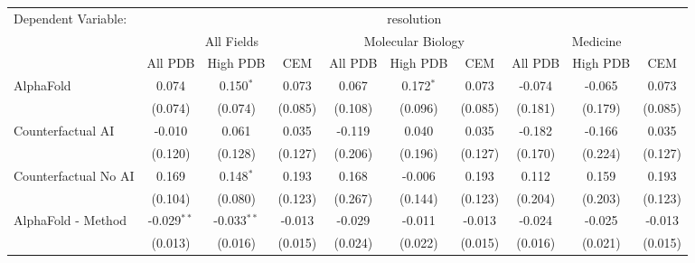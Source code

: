 \begingroup
\centering
\begin{tabular}{lccccccccc}
   \tabularnewline \midrule \midrule
   Dependent Variable: & \multicolumn{9}{c}{resolution}\\
 & \multicolumn{3}{c}{All Fields} & \multicolumn{3}{c}{Molecular Biology} & \multicolumn{3}{c}{Medicine} \\
\cmidrule(lr){2-7} \cmidrule(lr){5-10} \cmidrule(lr){8-7}
 & \multicolumn{1}{c}{All PDB} & \multicolumn{1}{c}{High PDB} & \multicolumn{1}{c}{CEM} & \multicolumn{1}{c}{All PDB} & \multicolumn{1}{c}{High PDB} & \multicolumn{1}{c}{CEM} & \multicolumn{1}{c}{All PDB} & \multicolumn{1}{c}{High PDB} & \multicolumn{1}{c}{CEM} \\
\cmidrule(lr){2-3} \cmidrule(lr){3-4} \cmidrule(lr){4-5} \cmidrule(lr){5-6} \cmidrule(lr){6-7} \cmidrule(lr){7-8} \cmidrule(lr){8-9} \cmidrule(lr){9-10} \cmidrule(lr){10-3}
   AlphaFold                                                   & 0.074         & 0.150$^{*}$   & 0.073         & 0.067        & 0.172$^{*}$  & 0.073         & -0.074       & -0.065  & 0.073\\   
                                                               & (0.074)       & (0.074)       & (0.085)       & (0.108)      & (0.096)      & (0.085)       & (0.181)      & (0.179) & (0.085)\\   
   Counterfactual AI                                           & -0.010        & 0.061         & 0.035         & -0.119       & 0.040        & 0.035         & -0.182       & -0.166  & 0.035\\   
                                                               & (0.120)       & (0.128)       & (0.127)       & (0.206)      & (0.196)      & (0.127)       & (0.170)      & (0.224) & (0.127)\\   
   Counterfactual No AI                                        & 0.169         & 0.148$^{*}$   & 0.193         & 0.168        & -0.006       & 0.193         & 0.112        & 0.159   & 0.193\\   
                                                               & (0.104)       & (0.080)       & (0.123)       & (0.267)      & (0.144)      & (0.123)       & (0.204)      & (0.203) & (0.123)\\   
   AlphaFold - Method                                          & -0.029$^{**}$ & -0.033$^{**}$ & -0.013        & -0.029       & -0.011       & -0.013        & -0.024       & -0.025  & -0.013\\   
                                                               & (0.013)       & (0.016)       & (0.015)       & (0.024)      & (0.022)      & (0.015)       & (0.016)      & (0.021) & (0.015)\\   

\end{tabular}
